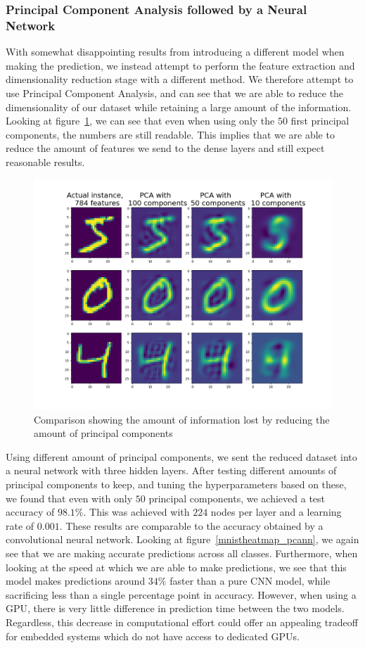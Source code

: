 \documentclass[onecolumn,10pt,cleanfoot]{asme2ej}
\begin{document}
\subsubsection{Principal Component Analysis followed by a Neural Network}

With somewhat disappointing results from introducing a different model when making the prediction, we instead attempt to perform the feature extraction and dimensionality reduction stage with a different method. We therefore attempt to use Principal Component Analysis, and can see that we are able to reduce the dimensionality of our dataset while retaining a large amount of the information. Looking at figure~\ref{pcacomp}, we can see that even when using only the $50$ first principal components, the numbers are still readable. This implies that we are able to reduce the amount of features we send to the dense layers and still expect reasonable results.

\begin{figure}[H]
\centerline{\includegraphics[width=5in]{figure/pcacomp.png}}
\caption{Comparison showing the amount of information lost by reducing the amount of principal components}
\label{pcacomp}
\end{figure}

Using different amount of principal components, we sent the reduced dataset into a neural network with three hidden layers. After testing different amounts of principal components to keep, and tuning the hyperparameters based on these, we found that even with only $50$ principal components, we achieved a test accuracy of $98.1\%$. This was achieved with $224$ nodes per layer and a learning rate of $0.001$. These results are comparable to the accuracy obtained by a convolutional neural network. Looking at figure~\ref{mnistheatmap_pcann}, we again see that we are making accurate predictions across all classes. Furthermore, when looking at the speed at which we are able to make predictions, we see that this model makes predictions around $34\%$ faster than a pure CNN model, while sacrificing less than a single percentage point in accuracy. However, when using a GPU, there is very little difference in prediction time between the two models. Regardless, this decrease in computational effort could offer an appealing tradeoff for embedded systems which do not have access to dedicated GPUs.
\end{document}
